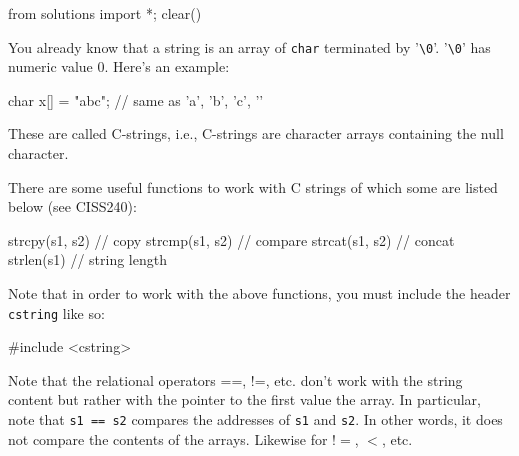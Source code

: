 \begin{python0}
from solutions import *; clear()
\end{python0}

You already know that a string is an array of \texttt{char} terminated by '\verb!\0!'. '\verb!\0!' has numeric value 0. Here's an example:

\begin{console}
char x[] = "abc"; // same as {'a', 'b', 'c', '\0'}
\end{console}

These are called C-strings, i.e., C-strings are character arrays
containing the null character.

There are some useful functions to work with C strings of which some are
listed below (see CISS240):

\begin{console}
strcpy(s1, s2) // copy
strcmp(s1, s2) // compare
strcat(s1, s2) // concat
strlen(s1) // string length
\end{console}

Note that in order to work with the above functions, you must include
the header \texttt{cstring} like so:

\begin{console}
#include <cstring>
\end{console}

Note that the relational operators ==, !=, etc. don't work with the string content but rather with the pointer to the first value the array. In particular, note that \texttt{s1 == s2} compares the addresses of \texttt{s1} and \texttt{s2}. In other words, it does not compare the contents of the arrays. Likewise for $!=$, $<$, etc.

